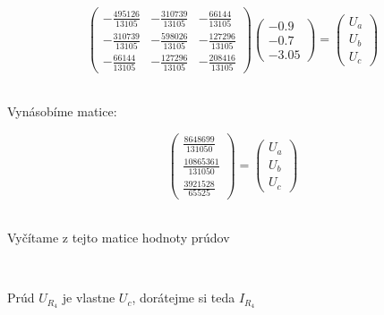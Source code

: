 \[
\begin{pmatrix}

-\frac{\num{495126}}{\num{13105}} & -\frac{\num{310739}}{\num{13105}} & -\frac{\num{66144}}{\num{13105}}\\
-\frac{\num{310739}}{\num{13105}} & -\frac{\num{598026}}{\num{13105}} & -\frac{\num{127296}}{\num{13105}}\\
-\frac{66144}{\num{13105}} & -\frac{127296}{\num{13105}} & -\frac{208416}{\num{13105}}

\end{pmatrix}
\begin{pmatrix}
    -0.9\\
    -0.7\\
    -3.05
\end{pmatrix}
=
\begin{pmatrix}
    U_a\\
    U_b\\
    U_c
\end{pmatrix}
\]\\


\newpage
\centerline{Vynásobíme matice:}
\centering
\[
\begin{pmatrix}
    \frac{\num{8648699}}{\num{131050}}\\
    \frac{\num{10865361}}{\num{131050}}\\
    \frac{\num{3921528}}{\num{65525}}
\end{pmatrix}
=
\begin{pmatrix}
    U_a\\
    U_b\\
    U_c
\end{pmatrix}
\]\\
\centerline{Vyčítame z tejto matice hodnoty prúdov}
\bigskip
\centering
{}
\\
\bigskip
\centerline{Prúd $U_{R_4}$ je vlastne $U_c$, dorátejme si teda $I_{R_4}$}
\bigskip
\centering
{}\\
\centering
\bigskip
{}


